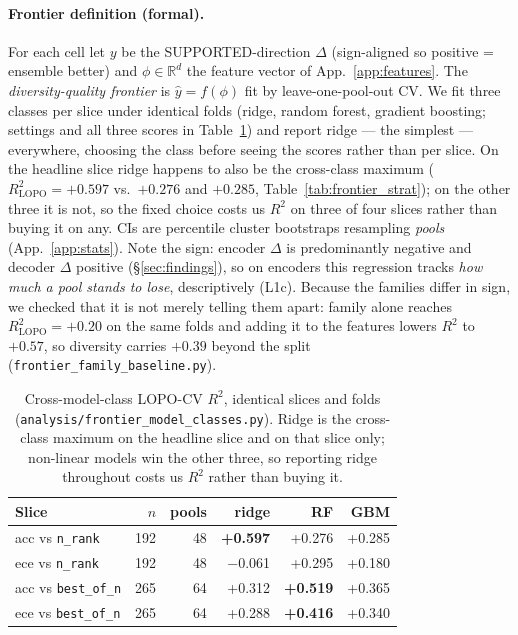 \documentclass[11pt]{article}
\begin{document}
\paragraph{Frontier definition (formal).} For each cell let $y$ be the SUPPORTED-direction $\Delta$ (sign-aligned so positive = ensemble better) and $\phi\!\in\!\mathbb{R}^{d}$ the feature vector of App.~\ref{app:features}. The \emph{diversity-quality frontier} is $\hat y = f(\phi)$ fit by leave-one-pool-out CV. We fit three classes per slice under identical folds (ridge, random forest, gradient boosting; settings and all three scores in Table~\ref{tab:frontier_cross}) and report ridge --- the simplest --- everywhere, choosing the class before seeing the scores rather than per slice. On the headline slice ridge happens to also be the cross-class maximum ($R^2_{\text{LOPO}}{=}{+}0.597$ vs.\ ${+}0.276$ and ${+}0.285$, Table~\ref{tab:frontier_strat}); on the other three it is not, so the fixed choice costs us $R^2$ on three of four slices rather than buying it on any. CIs are percentile cluster bootstraps resampling \emph{pools} (App.~\ref{app:stats}). Note the sign: encoder $\Delta$ is predominantly negative and decoder $\Delta$ positive (\S\ref{sec:findings}), so on encoders this regression tracks \emph{how much a pool stands to lose}, descriptively (L1c). Because the families differ in sign, we checked that it is not merely telling them apart: family alone reaches $R^2_{\text{LOPO}}{=}{+}0.20$ on the same folds and adding it to the features lowers $R^2$ to ${+}0.57$, so diversity carries ${+}0.39$ beyond the split (\texttt{frontier\_\allowbreak family\_\allowbreak baseline.\allowbreak py}).

\begin{table}[h]
\centering
\caption{Cross-model-class LOPO-CV $R^2$, identical slices and folds (\texttt{analysis/\allowbreak frontier\_\allowbreak model\_\allowbreak classes.\allowbreak py}). Ridge is the cross-class maximum on the headline slice and on that slice only; non-linear models win the other three, so reporting ridge throughout costs us $R^2$ rather than buying it.}
\label{tab:frontier_cross}
\small
\setlength{\tabcolsep}{3pt}
\begin{tabular}{@{}lrrrrr@{}}
\toprule
Slice & $n$ & pools & ridge & RF & GBM \\
\midrule
acc vs \texttt{n\_rank}     & 192 & 48 & \textbf{+0.597} & +0.276 & +0.285 \\
ece vs \texttt{n\_rank}     & 192 & 48 & $-$0.061 & +0.295 & +0.180 \\
acc vs \texttt{best\_of\_n} & 265 & 64 & +0.312 & \textbf{+0.519} & +0.365 \\
ece vs \texttt{best\_of\_n} & 265 & 64 & +0.288 & \textbf{+0.416} & +0.340 \\
\bottomrule
\end{tabular}
\end{table}
\end{document}

